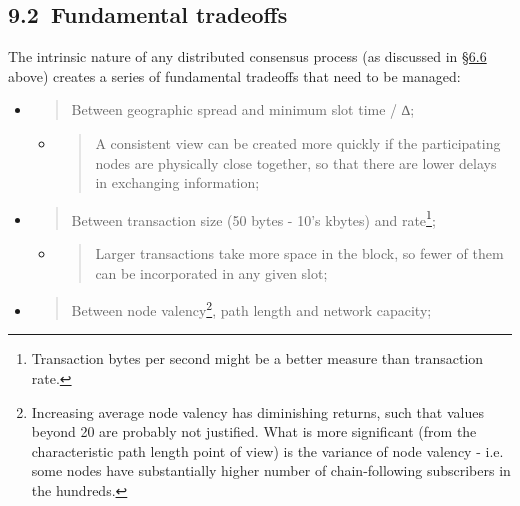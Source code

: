 \documentclass[]{article}
\begin{document}
\hypertarget{fundamental-tradeoffs}{%
\subsection{​9.2​~Fundamental tradeoffs}\label{fundamental-tradeoffs}}

The intrinsic nature of any distributed consensus process (as discussed
in \protect\hyperlink{decentralisation-constraints}{{§6.6}} above)
creates a series of fundamental tradeoffs that need to be managed:

\begin{itemize}
\item
  \begin{quote}
  Between geographic spread and minimum slot time / ∆;
  \end{quote}

  \begin{itemize}
  \item
    \begin{quote}
    A consistent view can be created more quickly if the participating
    nodes are physically close together, so that there are lower delays
    in exchanging information;
    \end{quote}
  \end{itemize}
\item
  \begin{quote}
  Between transaction size (50 bytes - 10's kbytes) and rate\footnote{Transaction
    bytes per second might be a better measure than transaction rate.};
  \end{quote}

  \begin{itemize}
  \item
    \begin{quote}
    Larger transactions take more space in the block, so fewer of them
    can be incorporated in any given slot;
    \end{quote}
  \end{itemize}
\item
  \begin{quote}
  Between node valency\footnote{Increasing average node valency has
    diminishing returns, such that values beyond 20 are probably not
    justified. What is more significant (from the characteristic path
    length point of view) is the variance of node valency - i.e. some
    nodes have substantially higher number of chain-following
    subscribers in the hundreds.}, path length and network capacity;
  \end{quote}


\end{itemize}
\end{document}
